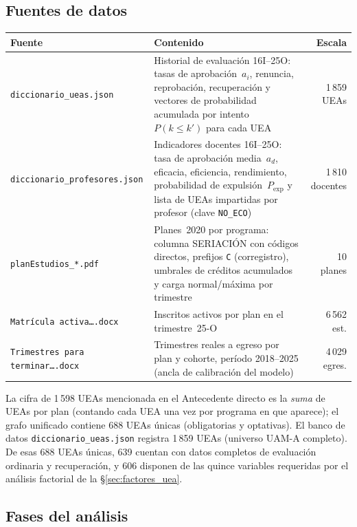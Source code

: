 \documentclass[11pt,letterpaper]{article}
\begin{document}
\subsection{Fuentes de datos}

\begin{tabularx}{\linewidth}{@{}l X r@{}}
\toprule
\textbf{Fuente} & \textbf{Contenido} & \textbf{Escala} \\
\midrule
\texttt{diccionario\_ueas.json} &
  Historial de evaluación 16I--25O: tasas de aprobación~$a_i$, renuncia,
  reprobación, recuperación y vectores de probabilidad acumulada por
  intento~$P(k\leq k')$ para cada UEA &
  1\,859 UEAs \\[4pt]
\texttt{diccionario\_profesores.json} &
  Indicadores docentes 16I--25O: tasa de aprobación media~$a_d$, eficacia,
  eficiencia, rendimiento, probabilidad de expulsión~$P_{\mathrm{exp}}$ y
  lista de UEAs impartidas por profesor (clave \texttt{NO\_ECO}) &
  1\,810 docentes \\[4pt]
\texttt{planEstudios\_*.pdf} &
  Planes~2020 por programa: columna SERIACIÓN con códigos directos,
  prefijos \texttt{C} (corregistro), umbrales de créditos acumulados
  y carga normal/máxima por trimestre &
  10 planes \\[4pt]
\texttt{Matrícula activa\ldots.docx} &
  Inscritos activos por plan en el trimestre~25-O &
  6\,562 est. \\[4pt]
\texttt{Trimestres para terminar\ldots.docx} &
  Trimestres reales a egreso por plan y cohorte, período 2018--2025
  (ancla de calibración del modelo) &
  4\,029 egres. \\
\bottomrule
\end{tabularx}

\begin{tcolorbox}[colback=gray!10, colframe=gray!50, title=Nota sobre recuento de UEAs]
La cifra de 1\,598 UEAs mencionada en el Antecedente directo es la
\emph{suma} de UEAs por plan (contando cada UEA una vez por programa
en que aparece); el grafo unificado contiene 688 UEAs únicas (obligatorias
y optativas).
El banco de datos \texttt{diccionario\_ueas.json} registra 1\,859 UEAs
(universo UAM-A completo). De esas 688 UEAs únicas, 639 cuentan
con datos completos de evaluación ordinaria y recuperación, y 606
disponen de las quince variables requeridas por el análisis factorial
de la \S\ref{sec:factores_uea}.
\end{tcolorbox}

\subsection{Fases del análisis}
\end{document}
